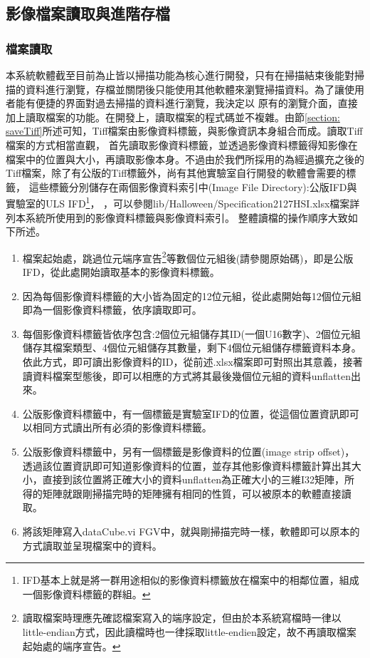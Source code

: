 \documentclass[12pt]{article}
\begin{document}
    \subsection{影像檔案讀取與進階存檔}
    \subsubsection{檔案讀取}
    本系統軟體截至目前為止皆以掃描功能為核心進行開發，只有在掃描結束後能對掃描的資料進行瀏覽，存檔並關閉後只能使用其他軟體來瀏覽掃描資料。為了讓使用者能有便捷的界面對過去掃描的資料進行瀏覽，我決定以
    原有的瀏覽介面，直接加上讀取檔案的功能。在開發上，讀取檔案的程式碼並不複雜。由節\ref{section: saveTiff}所述可知，Tiff檔案由影像資料標籤，與影像資訊本身組合而成。讀取Tiff檔案的方式相當直觀，
    首先讀取影像資料標籤，並透過影像資料標籤得知影像在檔案中的位置與大小，再讀取影像本身。不過由於我們所採用的為經過擴充之後的Tiff檔案，除了有公版的Tiff標籤外，尚有其他實驗室自行開發的軟體會需要的標籤，
    這些標籤分別儲存在兩個影像資料索引中(Image File Directory):公版IFD與實驗室的ULS IFD\footnote{IFD基本上就是將一群用途相似的影像資料標籤放在檔案中的相鄰位置，組成一個影像資料標籤的群組。}，
    ，可以參閱lib/Halloween/Specification21\textunderscore27HSI.xlsx檔案詳列本系統所使用到的影像資料標籤與影像資料索引。
    整體讀檔的操作順序大致如下所述。
    \begin{enumerate}
        \item 檔案起始處，跳過位元端序宣告\footnote{讀取檔案時理應先確認檔案寫入的端序設定，但由於本系統寫檔時一律以little-endian方式，因此讀檔時也一律採取little-endien設定，故不再讀取檔案起始處的端序宣告。}等數個位元組後(請參閱原始碼)，即是公版IFD，從此處開始讀取基本的影像資料標籤。
        \item 因為每個影像資料標籤的大小皆為固定的12位元組，從此處開始每12個位元組即為一個影像資料標籤，依序讀取即可。
        \item 每個影像資料標籤皆依序包含:2個位元組儲存其ID(一個U16數字)、2個位元組儲存其檔案類型、4個位元組儲存其數量，剩下4個位元組儲存標籤資料本身。依此方式，即可讀出影像資料的ID，從前述.xlsx檔案即可對照出其意義，接著讀資料檔案型態後，即可以相應的方式將其最後幾個位元組的資料unflatten出來。
        \item 公版影像資料標籤中，有一個標籤是實驗室IFD的位置，從這個位置資訊即可以相同方式讀出所有必須的影像資料標籤。
        \item 公版影像資料標籤中，另有一個標籤是影像資料的位置(image strip offset)，透過該位置資訊即可知道影像資料的位置，並存其他影像資料標籤計算出其大小，直接到該位置將正確大小的資料unflatten為正確大小的三維I32矩陣，所得的矩陣就跟剛掃描完時的矩陣擁有相同的性質，可以被原本的軟體直接讀取。
        \item 將該矩陣寫入dataCube.vi FGV中，就與剛掃描完時一樣，軟體即可以原本的方式讀取並呈現檔案中的資料。
    \end{enumerate}
\end{document}
